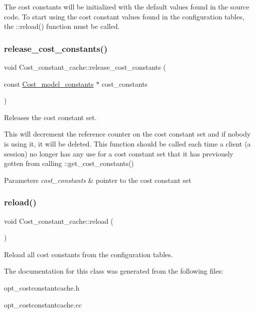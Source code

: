 The cost constants will be initialized with the default values found in the source code. To start using the cost constant values found in the configuration tables, the \+::reload() function must be called. \mbox{\label{classCost__constant__cache_a9f8a07c3d8481469e7aebadd3b11298f}} 
\subsubsection{\texorpdfstring{release\+\_\+cost\+\_\+constants()}{release\_cost\_constants()}}
{\footnotesize\ttfamily void Cost\+\_\+constant\+\_\+cache\+::release\+\_\+cost\+\_\+constants (\begin{DoxyParamCaption}\item[{const \mbox{\hyperlink{classCost__model__constants}{Cost\+\_\+model\+\_\+constants}} $\ast$}]{cost\+\_\+constants }\end{DoxyParamCaption})\hspace{0.3cm}{\ttfamily [inline]}}

Releases the cost constant set.

This will decrement the reference counter on the cost constant set and if nobody is using it, it will be deleted. This function should be called each time a client (a session) no longer has any use for a cost constant set that it has previously gotten from calling \+::get\+\_\+cost\+\_\+constants()


\begin{DoxyParams}{Parameters}
{\em cost\+\_\+constants} & pointer to the cost constant set \\
\hline
\end{DoxyParams}
\mbox{\label{classCost__constant__cache_a44df0f5b25e6e62b9df8d15451616921}} 
\subsubsection{\texorpdfstring{reload()}{reload()}}
{\footnotesize\ttfamily void Cost\+\_\+constant\+\_\+cache\+::reload (\begin{DoxyParamCaption}{ }\end{DoxyParamCaption})}

Reload all cost constants from the configuration tables. 

The documentation for this class was generated from the following files\+:\begin{DoxyCompactItemize}
\item 
opt\+\_\+costconstantcache.\+h\item 
opt\+\_\+costconstantcache.\+cc\end{DoxyCompactItemize}
